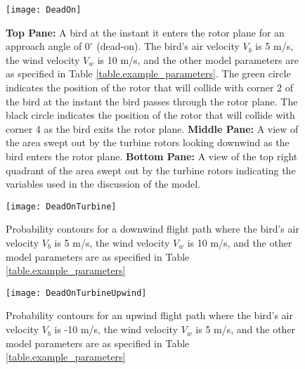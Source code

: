 \documentclass[10pt,conference]{IEEEtran}
\begin{document}
\begin{figure}[h!]
   \centering
   \texttt{[image: DeadOn]}
   \caption{\textbf{Top Pane:} A bird at the instant it enters the rotor plane for an approach angle of $0^\circ$ (dead-on). The bird's air velocity $V_b$ is 5
m/s, the wind velocity $V_w$ is 10 m/s, and the other model parameters are as specified in Table
\ref{table.example_parameters}. The green circle indicates the position of the rotor that will collide with corner 2 of
the bird at the instant the bird passes through the rotor plane. The black circle indicates the position of the rotor
that will collide with corner 4 as the bird exits the rotor plane. \textbf{Middle Pane:} A view of the area swept out
by the turbine rotors looking downwind as the bird enters the rotor plane. \textbf{Bottom Pane:} A view of the top
right quadrant of the area swept out by the turbine rotors indicating the variables used in the discussion of the
model.}
   \label{fig.DeadOn}
   \end{figure}

\begin{figure}
   \centering
   \texttt{[image: DeadOnTurbine]}
   \caption{Probability contours for a downwind flight path where the bird's air velocity $V_b$ is 5
m/s, the wind velocity $V_w$ is 10 m/s, and the other model parameters are as specified in Table
\ref{table.example_parameters}}
   \label{fig.DeadOnTurbine}
   \end{figure}

\begin{figure}
   \centering
   \texttt{[image: DeadOnTurbineUpwind]}
   \caption{Probability contours for an upwind flight path where the bird's air velocity $V_b$ is -10
m/s, the wind velocity $V_w$ is 5 m/s, and the other model parameters are as specified in Table
\ref{table.example_parameters}}
   \label{fig.DeadOnTurbineUpwind}
   \end{figure}
\end{document}
